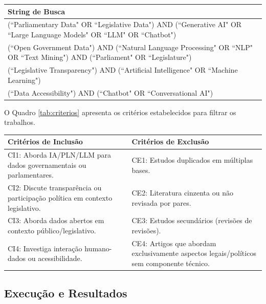 \begin{quadro}[H]
    \centering
    \caption{Strings de Busca (Conceituais)}
    \label{tab:string_busca}
    \begin{tabular}{p{13cm}}
    \toprule
    \textbf{String de Busca} \\
    \midrule
    (``Parliamentary Data" OR ``Legislative Data") AND (``Generative AI" OR ``Large Language Models" OR ``LLM" OR ``Chatbot") \\
    (``Open Government Data") AND (``Natural Language Processing" OR ``NLP" OR ``Text Mining") AND (``Parliament" OR ``Legislature") \\
    (``Legislative Transparency") AND (``Artificial Intelligence" OR ``Machine Learning") \\
    (``Data Accessibility") AND (``Chatbot" OR ``Conversational AI") \\
    \bottomrule
    \end{tabular}
\end{quadro}

O Quadro \ref{tab:criterios} apresenta os critérios estabelecidos para filtrar os trabalhos.

\begin{quadro}[H]
    \centering
    \caption{Critérios de Inclusão e Exclusão}
    \label{tab:criterios}
    \begin{tabular}{p{6.5cm}p{6.5cm}}
    \toprule
    \textbf{Critérios de Inclusão} & \textbf{Critérios de Exclusão} \\
    \midrule
    CI1: Aborda IA/PLN/LLM para dados governamentais ou parlamentares. & CE1: Estudos duplicados em múltiplas bases. \\
    CI2: Discute transparência ou participação política em contexto legislativo. & CE2: Literatura cinzenta ou não revisada por pares. \\
    CI3: Aborda dados abertos em contexto público/legislativo. & CE3: Estudos secundários (revisões de revisões). \\
    CI4: Investiga interação humano-dados ou acessibilidade. & CE4: Artigos que abordam exclusivamente aspectos legais/políticos sem componente técnico. \\
    \bottomrule
    \end{tabular}
\end{quadro}

\subsection{Execução e Resultados}

